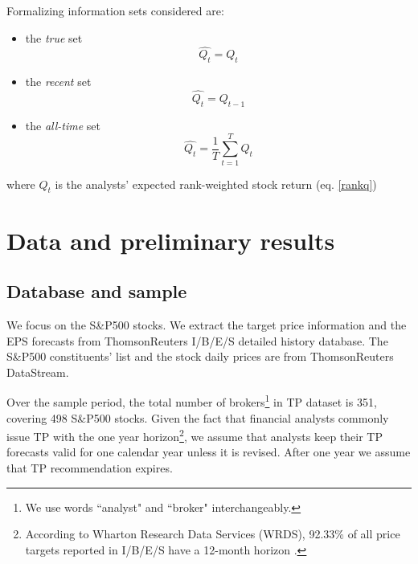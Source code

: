 \documentclass{article}\usepackage[]{graphicx}\usepackage[]{color}
\newcommand{\tr}{\textit{true}}
\newcommand{\naive}{\textit{recent}}
\newcommand{\default}{\textit{all-time}}
\begin{document}
Formalizing information sets considered are: 
\begin{itemize}
\item  the \tr{} set%
\begin{equation}
\label{q:true}
\widehat{Q_{t}}=Q_{t}
\end{equation}

\item  the \naive{} set %
\begin{equation}
\label{q:naive}
\widehat{Q_{t}}=Q_{t-1}
\end{equation}

\item  the \default{}  set%
\begin{equation}
\label{q:default}
\widehat{Q_{t}} = \frac{1}{T} \sum_{t=1}^{T} Q_{t}
\end{equation}
\end{itemize}
where $Q_{t}$ is the analysts' expected rank-weighted stock return (eq. \ref{rankq})

\section{Data and preliminary results}
\label{sec:rankings}

\subsection{Database and sample}
We focus on the  S\&P500 stocks. We extract the target price information and the EPS forecasts from ThomsonReuters  I/B/E/S detailed history database. The  S\&P500 constituents' list and the stock daily prices are from ThomsonReuters DataStream.


Over the sample period, the total number of brokers\footnote{We use words ``analyst" and ``broker" interchangeably.} in TP dataset is 351, covering 498 S\&P500 stocks. Given the fact that financial analysts commonly issue TP with the one year horizon\footnote{According to Wharton Research Data Services (WRDS), 92.33\% of all price targets reported in I/B/E/S have a 12-month horizon \citep{glushkov2009}.}, we assume that analysts keep their TP forecasts valid for one calendar year unless it is revised. After one year we assume that TP recommendation expires.
\end{document}
